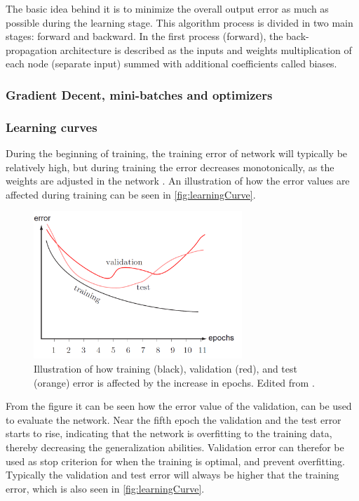 The basic idea behind it is to minimize the overall output error as much as possible during the learning stage. This algorithm process is divided in two main stages: forward and backward. In the first process (forward), the back-propagation architecture is described as  the inputs and weights multiplication of each node (separate input) summed with additional coefficients called biases.\citep{Hameed2016} 

\subsubsection{Gradient Decent, mini-batches and optimizers}


\subsubsection{Learning curves}
During the beginning of training, the training error of network will typically be relatively high, but during training the error decreases monotonically, as the weights are adjusted in the network \citep{Duda2000}. An illustration of how the error values are affected during training can be seen in \autoref{fig:learningCurve}.

\begin{figure} [H]
\centering
\includegraphics[width=0.7\textwidth]{figures/learningCurves}
\caption{Illustration of how training (black), validation (red), and test (orange) error is affected by the increase in epochs. Edited from \citep{Duda2000}.}
\label{fig:learningCurve}
\end{figure}

From the figure it can be seen how the error value of the validation, can be used to evaluate the network. 
Near the fifth epoch the validation and the test error starts to rise, indicating that the network is overfitting to the training data, thereby decreasing the generalization abilities. 
Validation error can therefor be used as stop criterion for when the training is optimal, and prevent overfitting. 
Typically the validation and test error will always be higher that the training error, which is also seen in \autoref{fig:learningCurve}. \citep{Duda2000}


